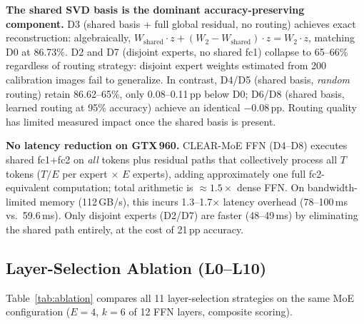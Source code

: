 \documentclass[conference]{IEEEtran}
\begin{document}
\textbf{The shared SVD basis is the dominant accuracy-preserving component.} D3 (shared basis + full global residual, no routing) achieves exact reconstruction: algebraically, $W_\text{shared}{\cdot}z + (W_2{-}W_\text{shared}){\cdot}z = W_2{\cdot}z$, matching D0 at 86.73\%. D2 and D7 (disjoint experts, no shared fc1) collapse to 65--66\% regardless of routing strategy: disjoint expert weights estimated from 200 calibration images fail to generalize. In contrast, D4/D5 (shared basis, \emph{random} routing) retain 86.62--65\%, only 0.08--0.11\,pp below D0; D6/D8 (shared basis, learned routing at 95\% accuracy) achieve an identical $-$0.08\,pp. Routing quality has limited measured impact once the shared basis is present.

\textbf{No latency reduction on GTX\,960.} CLEAR-MoE FFN (D4--D8) executes shared fc1+fc2 on \emph{all} tokens plus residual paths that collectively process all $T$ tokens ($T/E$ per expert $\times$ $E$ experts), adding approximately one full fc2-equivalent computation; total arithmetic is $\approx\!1.5\times$ dense FFN. On bandwidth-limited memory (112\,GB/s), this incurs 1.3--1.7$\times$ latency overhead (78--100\,ms vs.\ 59.6\,ms). Only disjoint experts (D2/D7) are faster (48--49\,ms) by eliminating the shared path entirely, at the cost of 21\,pp accuracy.

\subsection{Layer-Selection Ablation (L0--L10)}
\label{sec:ablation}

Table~\ref{tab:ablation} compares all 11 layer-selection strategies on the same MoE configuration ($E{=}4$, $k{=}6$ of 12 FFN layers, composite scoring).
\end{document}
